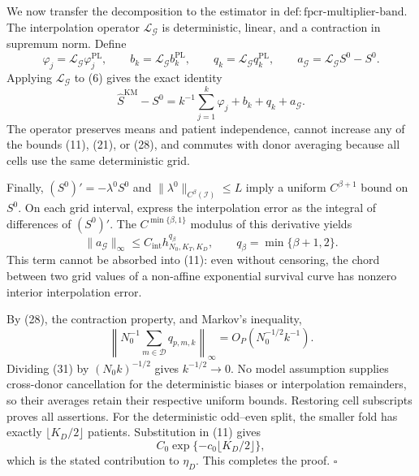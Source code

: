 We now transfer the decomposition to the estimator in \(\mathrm{def:fpcr\mbox{-}multiplier\mbox{-}band}\).  The interpolation operator \(\mathcal L_{\mathcal G}\) is deterministic, linear, and a contraction in supremum norm.  Define
\[
 \varphi_j=\mathcal L_{\mathcal G}\varphi_j^{\mathrm{PL}},
 \qquad b_k=\mathcal L_{\mathcal G}b_k^{\mathrm{PL}},
 \qquad q_k=\mathcal L_{\mathcal G}q_k^{\mathrm{PL}},
 \qquad a_{\mathcal G}=\mathcal L_{\mathcal G}S^0-S^0.
\]
Applying \(\mathcal L_{\mathcal G}\) to (6) gives the exact identity
\[
 \widehat S^{\mathrm{KM}}-S^0
 =k^{-1}\sum_{j=1}^k\varphi_j+b_k+q_k+a_{\mathcal G}.        \tag{29}
\]
The operator preserves means and patient independence, cannot increase any of the bounds (11), (21), or (28), and commutes with donor averaging because all cells use the same deterministic grid.

Finally, \((S^0)'=-\lambda^0S^0\) and \(\|\lambda^0\|_{C^\beta(\mathcal I)}\le L\) imply a uniform \(C^{\beta+1}\) bound on \(S^0\).  On each grid interval, express the interpolation error as the integral of differences of \((S^0)'\).  The \(C^{\min\{\beta,1\}}\) modulus of this derivative yields
\[
 \|a_{\mathcal G}\|_\infty
 \le C_{\mathrm{int}}h_{N_0,K_T,K_D}^{q_\beta},
 \qquad q_\beta=\min\{\beta+1,2\}.                         \tag{30}
\]
This term cannot be absorbed into (11): even without censoring, the chord between two grid values of a non-affine exponential survival curve has nonzero interior interpolation error.

By (28), the contraction property, and Markov's inequality,
\[
 \left\|N_0^{-1}\sum_{m\in\mathcal D}q_{p,m,k}\right\|_\infty
 =O_P(N_0^{-1/2}k^{-1}).                                    \tag{31}
\]
Dividing (31) by \((N_0k)^{-1/2}\) gives \(k^{-1/2}\to0\).  No model assumption supplies cross-donor cancellation for the deterministic biases or interpolation remainders, so their averages retain their respective uniform bounds.  Restoring cell subscripts proves all assertions.  For the deterministic odd--even split, the smaller fold has exactly \(\lfloor K_D/2\rfloor\) patients.  Substitution in (11) gives
\[
 C_0\exp\{-c_0\lfloor K_D/2\rfloor\},
\]
which is the stated contribution to \(\eta_D\).  This completes the proof. \(\square\)